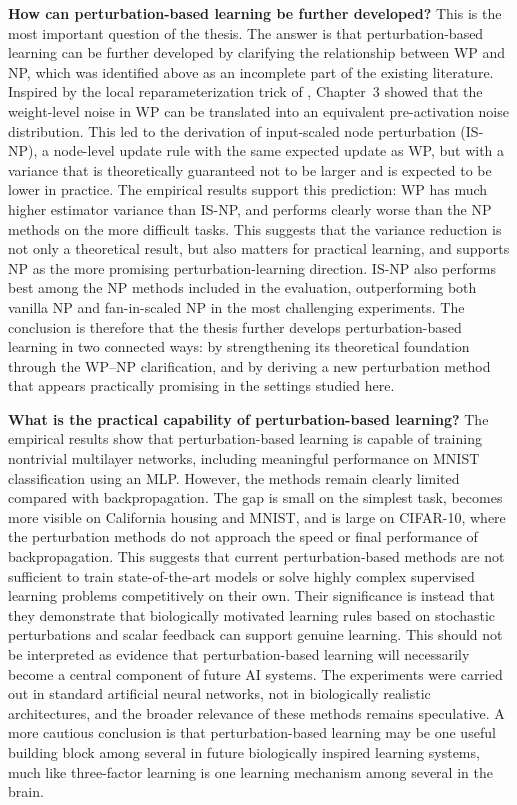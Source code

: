 \textbf{How can perturbation-based learning be further developed?}  
This is the most important question of the thesis. The answer is that perturbation-based learning can be further developed by clarifying the relationship between WP and NP, which was identified above as an incomplete part of the existing literature. Inspired by the local reparameterization trick of \textcite{kingma_variational_2015}, Chapter~3 showed that the weight-level noise in WP can be translated into an equivalent pre-activation noise distribution. This led to the derivation of input-scaled node perturbation (IS-NP), a node-level update rule with the same expected update as WP, but with a variance that is theoretically guaranteed not to be larger and is expected to be lower in practice. The empirical results support this prediction: WP has much higher estimator variance than IS-NP, and performs clearly worse than the NP methods on the more difficult tasks. This suggests that the variance reduction is not only a theoretical result, but also matters for practical learning, and supports NP as the more promising perturbation-learning direction. IS-NP also performs best among the NP methods included in the evaluation, outperforming both vanilla NP and fan-in-scaled NP in the most challenging experiments. The conclusion is therefore that the thesis further develops perturbation-based learning in two connected ways: by strengthening its theoretical foundation through the WP--NP clarification, and by deriving a new perturbation method that appears practically promising in the settings studied here.

\textbf{What is the practical capability of perturbation-based learning?}  
The empirical results show that perturbation-based learning is capable of training nontrivial multilayer networks, including meaningful performance on MNIST classification using an MLP. However, the methods remain clearly limited compared with backpropagation. The gap is small on the simplest task, becomes more visible on California housing and MNIST, and is large on CIFAR-10, where the perturbation methods do not approach the speed or final performance of backpropagation. This suggests that current perturbation-based methods are not sufficient to train state-of-the-art models or solve highly complex supervised learning problems competitively on their own. Their significance is instead that they demonstrate that biologically motivated learning rules based on stochastic perturbations and scalar feedback can support genuine learning. This should not be interpreted as evidence that perturbation-based learning will necessarily become a central component of future AI systems. The experiments were carried out in standard artificial neural networks, not in biologically realistic architectures, and the broader relevance of these methods remains speculative. A more cautious conclusion is that perturbation-based learning may be one useful building block among several in future biologically inspired learning systems, much like three-factor learning is one learning mechanism among several in the brain.

